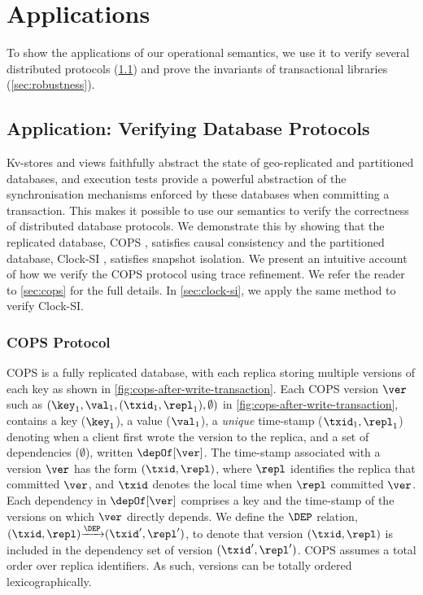 \section{Applications}
\label{sec:applications}
\label{sec:program-analysis}

To show the applications of our operational semantics, 
we use it to verify several distributed protocols \!(\cref{sec:verify-impl})\! and
prove the invariants of transactional libraries \!(\cref{sec:robustness}).

\subsection{Application: Verifying Database Protocols}
\label{sec:verify-impl}
Kv-stores and views faithfully abstract the state of geo-replicated and partitioned
databases, and execution tests provide a powerful abstraction of the synchronisation mechanisms 
enforced by these databases when committing a transaction. 
This makes it possible to use our 
semantics to verify the correctness of distributed database protocols. 
We demonstrate this by showing that the replicated database,
COPS \cite{cops}, satisfies causal consistency and
the partitioned database, Clock-SI \cite{clocksi}, satisfies snapshot isolation.
We present an intuitive account of how we verify the COPS protocol using trace refinement.
We refer the reader to \cref{sec:cops} for the full details.
In \cref{sec:clock-si}, we apply the same method to verify Clock-SI.



\subsubsection{COPS Protocol} 
COPS is a fully replicated database, with each replica storing multiple versions of each key as shown in \cref{fig:cops-after-write-transaction}. 
Each COPS version \( \ver \)
such as \( (\key_1,\val_1,(\txid_1,\repl_1), \emptyset) \) in \cref{fig:cops-after-write-transaction},
contains a key ($\key_1$), a value ($\val_1$), a \emph{unique} time-stamp ($\txid_1, \repl_1$) denoting
when a client first wrote the version to the replica, 
and a set of dependencies ($\emptyset$), written $\depOf[\ver]$. 
The time-stamp associated with a version $\ver$ has the form $(\txid, \repl)$, where $\repl$ identifies the replica that committed $\ver$, 
and $\txid$ denotes the local time when $\repl$ committed $\ver$. 
Each dependency in $\depOf[\ver]$ comprises a key and the time-stamp of the versions on which $\ver$ directly depends.  
We define the \( \DEP \) relation, \( (\txid,\repl) {\xrightarrow{\DEP}} (\txid',\repl') \),
to denote that version \( (\txid,\repl) \) is included in the dependency set of version \( (\txid',\repl')\).
COPS assumes a total order over replica identifiers. 
As such, versions can be totally ordered lexicographically. 

